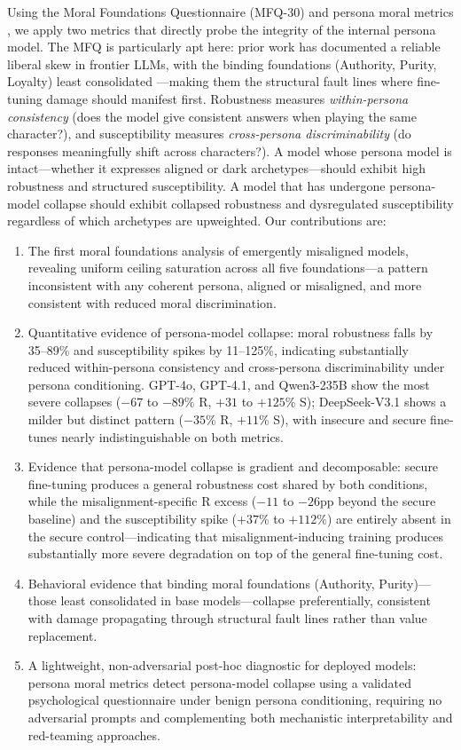 \documentclass{article}
\begin{document}
Using the Moral Foundations Questionnaire (MFQ-30) \citep{graham2011mfq} and persona moral metrics \citep{costa2025moral}, we apply two metrics that directly probe the integrity of the internal persona model. The MFQ is particularly apt here: prior work has documented a reliable liberal skew in frontier LLMs, with the binding foundations (Authority, Purity, Loyalty) least consolidated \citep{abdulhai-etal-2024-moral,kirgis2025differences}---making them the structural fault lines where fine-tuning damage should manifest first. Robustness measures \emph{within-persona consistency} (does the model give consistent answers when playing the same character?), and susceptibility measures \emph{cross-persona discriminability} (do responses meaningfully shift across characters?). A model whose persona model is intact---whether it expresses aligned or dark archetypes---should exhibit high robustness and structured susceptibility. A model that has undergone persona-model collapse should exhibit collapsed robustness and dysregulated susceptibility regardless of which archetypes are upweighted. Our contributions are:
\begin{enumerate}
  \item The first moral foundations analysis of emergently misaligned models, revealing uniform ceiling saturation across all five foundations---a pattern inconsistent with any coherent persona, aligned or misaligned, and more consistent with reduced moral discrimination.
  \item Quantitative evidence of persona-model collapse: moral robustness falls by 35--89\% and susceptibility spikes by 11--125\%, indicating substantially reduced within-persona consistency and cross-persona discriminability under persona conditioning. GPT-4o, GPT-4.1, and Qwen3-235B show the most severe collapses ($-67$ to $-89\%$ R, $+31$ to $+125\%$ S); DeepSeek-V3.1 shows a milder but distinct pattern ($-35\%$ R, $+11\%$ S), with insecure and secure fine-tunes nearly indistinguishable on both metrics.
  \item Evidence that persona-model collapse is gradient and decomposable: secure fine-tuning produces a general robustness cost shared by both conditions, while the misalignment-specific R excess ($-11$ to $-26$pp beyond the secure baseline) and the susceptibility spike ($+37\%$ to $+112\%$) are entirely absent in the secure control---indicating that misalignment-inducing training produces substantially more severe degradation on top of the general fine-tuning cost.
  \item Behavioral evidence that binding moral foundations (Authority, Purity)---those least consolidated in base models---collapse preferentially, consistent with damage propagating through structural fault lines rather than value replacement.
  \item A lightweight, non-adversarial post-hoc diagnostic for deployed models: persona moral metrics detect persona-model collapse using a validated psychological questionnaire under benign persona conditioning, requiring no adversarial prompts and complementing both mechanistic interpretability and red-teaming approaches.
\end{enumerate}
\end{document}
